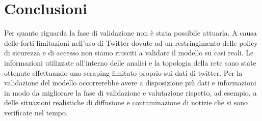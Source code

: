 \section{Conclusioni}
    Per quanto riguarda la fase di validazione non è stata possibile attuarla. A causa delle forti limitazioni nell'uso di Twitter dovute ad un restringimento delle policy di sicurezza e di accesso non siamo riusciti a validare il modello su casi reali. Le informazioni utilizzate all'interno delle analisi e la topologia della rete sono state ottenute effettuando uno scraping limitato proprio sui dati di twitter. Per la validazione del modello occorrerebbe avere a disposizione più dati e informazioni in modo da migliorare la fase di validazione e valutazione rispetto, ad esempio, a delle situazioni realistiche di diffusione e contaminazione di notizie che si sono verificate nel tempo.